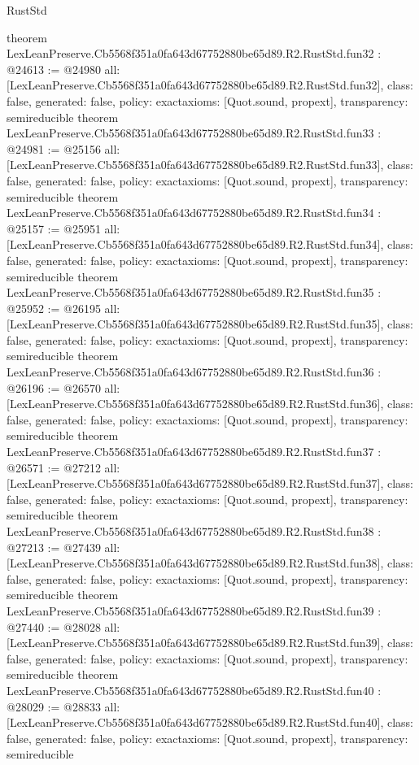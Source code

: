 \begin{lexlean}{RustStd}
\begin{coremodule}
{}
theorem LexLeanPreserve.Cb5568f351a0fa643d67752880be65d89.R2.RustStd.fun32 : @24613 := @24980 {
  all: [LexLeanPreserve.Cb5568f351a0fa643d67752880be65d89.R2.RustStd.fun32],
  class: false,
  generated: false,
  policy: exact{axioms: [Quot.sound, propext]},
  transparency: semireducible
}
theorem LexLeanPreserve.Cb5568f351a0fa643d67752880be65d89.R2.RustStd.fun33 : @24981 := @25156 {
  all: [LexLeanPreserve.Cb5568f351a0fa643d67752880be65d89.R2.RustStd.fun33],
  class: false,
  generated: false,
  policy: exact{axioms: [Quot.sound, propext]},
  transparency: semireducible
}
theorem LexLeanPreserve.Cb5568f351a0fa643d67752880be65d89.R2.RustStd.fun34 : @25157 := @25951 {
  all: [LexLeanPreserve.Cb5568f351a0fa643d67752880be65d89.R2.RustStd.fun34],
  class: false,
  generated: false,
  policy: exact{axioms: [Quot.sound, propext]},
  transparency: semireducible
}
theorem LexLeanPreserve.Cb5568f351a0fa643d67752880be65d89.R2.RustStd.fun35 : @25952 := @26195 {
  all: [LexLeanPreserve.Cb5568f351a0fa643d67752880be65d89.R2.RustStd.fun35],
  class: false,
  generated: false,
  policy: exact{axioms: [Quot.sound, propext]},
  transparency: semireducible
}
theorem LexLeanPreserve.Cb5568f351a0fa643d67752880be65d89.R2.RustStd.fun36 : @26196 := @26570 {
  all: [LexLeanPreserve.Cb5568f351a0fa643d67752880be65d89.R2.RustStd.fun36],
  class: false,
  generated: false,
  policy: exact{axioms: [Quot.sound, propext]},
  transparency: semireducible
}
theorem LexLeanPreserve.Cb5568f351a0fa643d67752880be65d89.R2.RustStd.fun37 : @26571 := @27212 {
  all: [LexLeanPreserve.Cb5568f351a0fa643d67752880be65d89.R2.RustStd.fun37],
  class: false,
  generated: false,
  policy: exact{axioms: [Quot.sound, propext]},
  transparency: semireducible
}
theorem LexLeanPreserve.Cb5568f351a0fa643d67752880be65d89.R2.RustStd.fun38 : @27213 := @27439 {
  all: [LexLeanPreserve.Cb5568f351a0fa643d67752880be65d89.R2.RustStd.fun38],
  class: false,
  generated: false,
  policy: exact{axioms: [Quot.sound, propext]},
  transparency: semireducible
}
theorem LexLeanPreserve.Cb5568f351a0fa643d67752880be65d89.R2.RustStd.fun39 : @27440 := @28028 {
  all: [LexLeanPreserve.Cb5568f351a0fa643d67752880be65d89.R2.RustStd.fun39],
  class: false,
  generated: false,
  policy: exact{axioms: [Quot.sound, propext]},
  transparency: semireducible
}
theorem LexLeanPreserve.Cb5568f351a0fa643d67752880be65d89.R2.RustStd.fun40 : @28029 := @28833 {
  all: [LexLeanPreserve.Cb5568f351a0fa643d67752880be65d89.R2.RustStd.fun40],
  class: false,
  generated: false,
  policy: exact{axioms: [Quot.sound, propext]},
  transparency: semireducible
}
\end{coremodule}
\end{lexlean}
